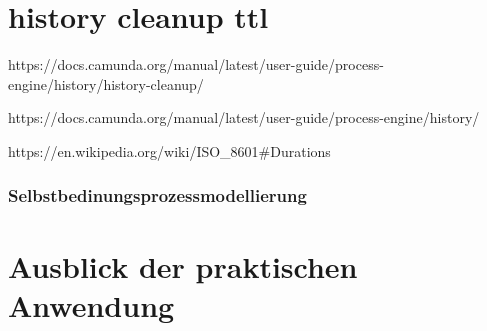 \section{history cleanup ttl}
https://docs.camunda.org/manual/latest/user-guide/process-engine/history/history-cleanup/

https://docs.camunda.org/manual/latest/user-guide/process-engine/history/

https://en.wikipedia.org/wiki/ISO_8601#Durations

\subsubsection{Selbstbedinungsprozessmodellierung}


\section{Ausblick der praktischen Anwendung}


 
